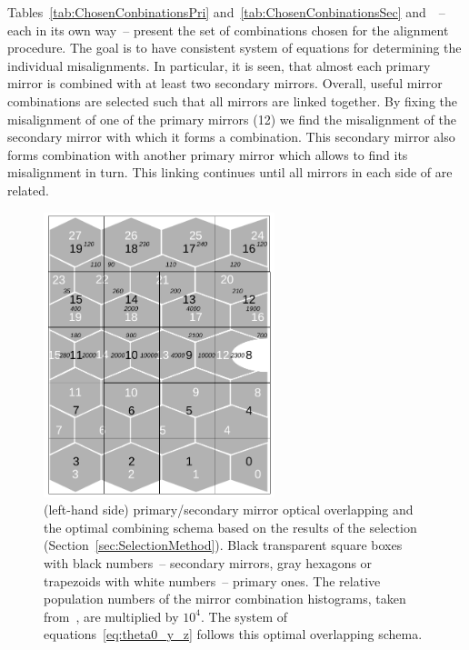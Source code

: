 %
%
Tables~\ref{tab:ChosenConbinationsPri} and~\ref{tab:ChosenConbinationsSec}
and~~--
%
each in its own way~-- present the set of combinations chosen for the alignment
procedure. The goal is to have consistent system of equations for determining
the individual misalignments. In particular, it is seen, that almost each
primary mirror is combined with at least two secondary mirrors. Overall, useful
mirror combinations are selected such that all mirrors are linked together. By
fixing the misalignment of one of the primary mirrors (12) we find the
misalignment of the secondary mirror with which it forms a combination. This
secondary mirror also forms combination with another primary mirror which allows
to find its misalignment in turn. This linking continues until all mirrors in
each side of \richtwo are related.
\begin{figure}[htbp]
  \vspace{-0.5\baselineskip}
  \centering
  \includegraphics[width=0.6\textwidth]{figs/Method/RICH2_MirrCombins_numbersAfterSelection.pdf}
  \vspace{-0.4\baselineskip}
  \caption{
    \richtwo (left-hand side) primary/secondary mirror optical overlapping and
    the optimal combining schema based on the results of the selection
    (Section~\ref{sec:SelectionMethod}). Black transparent square boxes with
    black numbers~-- secondary mirrors, gray hexagons or trapezoids with white
    numbers~-- primary ones. The relative population numbers of the mirror
    combination histograms, taken from~, are
    multiplied by $10^4$. The system of equations~\ref{eq:theta0_y_z} follows
    this optimal overlapping schema.}
  \label{fig:RICH2_MirrCombinSchema}
  \vspace{-0.6\baselineskip}
\end{figure}

